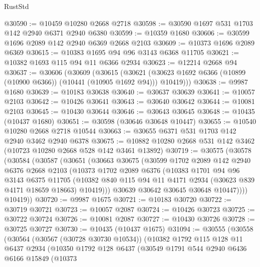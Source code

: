 \begin{lexlean}{RustStd}
\begin{coremodule}
@30590 := @10459 @10280 @2668 @2718
@30598 := @30590 @1697 @531 @1703 @142 @2940 @6371 @2940 @6380
@30599 := @10359 @1680
@30606 := @30599 @1696 @2089 @142 @2940 @6369 @2668 @2103
@30609 := @10373 @1696 @2089 @6369
@30615 := @10383 @1695 @94 @96 @3143 @6368 @11705
@30621 := @10382 @1693 @115 @94 @11 @6366 @2934
@30623 := @12214 @2668 @94
@30637 := @30606
    (@30609
      (@30615
        (@30621 (@30623 @1692 @6366 (@10899 (@10900 @6366)) (@10441 (@10905 @1692 @94))) @10419)))
@30638 := @9987 @1680
@30639 := @10183 @30638
@30640 := @30637 @30639
@30641 := @10057 @2103
@30642 := @10426 @30641
@30643 := @30640 @30642
@30644 := @10081 @2103
@30645 := @10430 @30644
@30646 := @30643 @30645
@30648 := @10435 (@10437 @1680)
@30651 := @30598 (@30646 @30648 @10447)
@30655 := @10540 @10280 @2668 @2718 @10544
@30663 := @30655 @6371 @531 @1703 @142 @2940 @3462 @2940 @6378
@30675 := @10882 @10280 @2668 @531 @142 @3462 (@10723 @10280 @2668 @528 @142 @3461 @13892)
@30719 := @30575
    (@30578
      (@30584
        (@30587
          (@30651
            (@30663
              @30675
              (@30599
                @1702
                @2089
                @142
                @2940
                @6376
                @2668
                @2103
                (@10373
                  @1702
                  @2089
                  @6376
                  (@10383
                    @1701
                    @94
                    @96
                    @3143
                    @6375
                    @11705
                    (@10382
                      @840
                      @115
                      @94
                      @11
                      @4171
                      @2934
                      (@30623 @839 @4171 @18659 @18663)
                      @10419)))
                @30639
                @30642
                @30645
                @30648
                @10447))))
        @10419))
@30720 := @9987 @1675
@30721 := @10183 @30720
@30722 := @30719 @30721
@30723 := @10057 @2087
@30724 := @10426 @30723
@30725 := @30722 @30724
@30726 := @10081 @2087
@30727 := @10430 @30726
@30728 := @30725 @30727
@30730 := @10435 (@10437 @1675)
@31094 := @30555
    (@30558
      (@30564
        (@30567 (@30728 @30730 @10534))
        (@10382
          @1792
          @115
          @128
          @11
          @6437
          @2934
          (@10350
            @1792
            @128
            @6437
            (@30549
              @1791
              @544
              @2940
              @6436
              @6166
              @15849
              (@10373

\end{coremodule}
\end{lexlean}
